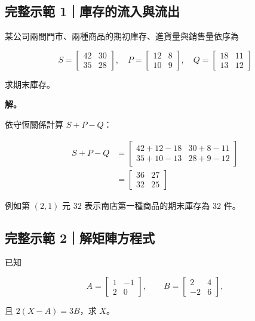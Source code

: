 \documentclass[11pt,a4paper]{article}
\begin{document}
\subsection{完整示範 1｜庫存的流入與流出}\label{ux5b8cux6574ux793aux7bc4-1ux5eabux5b58ux7684ux6d41ux5165ux8207ux6d41ux51fa}

某公司兩間門市、兩種商品的期初庫存、進貨量與銷售量依序為

\[
S=\begin{bmatrix}42&30\\35&28\end{bmatrix},
\quad
P=\begin{bmatrix}12&8\\10&9\end{bmatrix},
\quad
Q=\begin{bmatrix}18&11\\13&12\end{bmatrix}
\]

求期末庫存。

\textbf{解。}

依守恆關係計算 \(S+P-Q\)：

\[
\begin{aligned}
S+P-Q
&=
\begin{bmatrix}42+12-18&30+8-11\\35+10-13&28+9-12\end{bmatrix}\\
&=\begin{bmatrix}36&27\\32&25\end{bmatrix}
\end{aligned}
\]

例如第 \((2,1)\) 元 \(32\) 表示南店第一種商品的期末庫存為 \(32\) 件。

\subsection{完整示範 2｜解矩陣方程式}\label{ux5b8cux6574ux793aux7bc4-2ux89e3ux77e9ux9663ux65b9ux7a0bux5f0f}

已知

\[
A=\begin{bmatrix}1&-1\\2&0\end{bmatrix},
\qquad
B=\begin{bmatrix}2&4\\-2&6\end{bmatrix},
\]

且 \(2(X-A)=3B\)，求 \(X\)。
\end{document}
